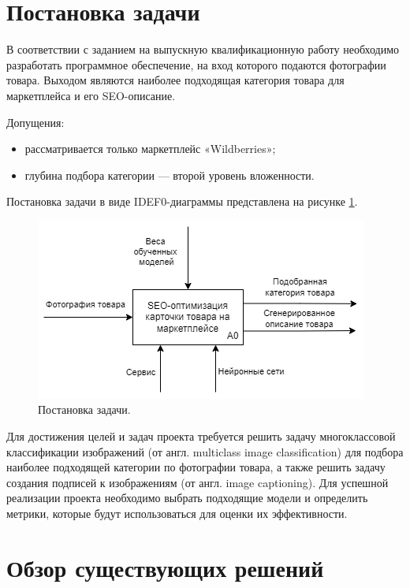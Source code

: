 \documentclass[a4paper,12pt]{extarticle}
\begin{document}
\newpage
\section{Постановка задачи}

В соответствии с заданием на выпускную квалификационную работу необходимо разработать программное обеспечение, на вход которого подаются фотографии товара. Выходом являются наиболее подходящая категория товара для маркетплейса и его SEO-описание.

Допущения:
\begin{itemize}
	\item рассматривается только маркетплейс «Wildberries»;
	\item глубина подбора категории — второй уровень вложенности.
\end{itemize}

Постановка задачи в виде IDEF0-диаграммы представлена на рисунке \ref{fig:hse-idef0}. 

\begin{figure}[ht]
	\centering
	\includegraphics[scale=0.8]{hseidef0.png}
	\caption{Постановка задачи.}
	\label{fig:hse-idef0}
\end{figure}

Для достижения целей и задач проекта требуется решить задачу многоклассовой классификации изображений (от англ. multiclass image classification) для подбора наиболее подходящей категории по фотографии товара, а также решить задачу создания подписей к изображениям (от англ. image captioning). Для успешной реализации проекта необходимо выбрать подходящие модели и определить метрики, которые будут использоваться для оценки их эффективности.

\newpage
\section{Обзор существующих решений}\label{exists}
\end{document}
